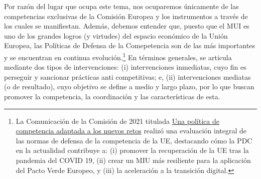 \documentclass[10pt,a4paper]{article}
\begin{document}
Por razón del lugar que ocupa este tema, nos ocuparemos únicamente de las competencias exclusivas de la Comisión Europea y los instrumentos a través de los cuales se manifiestan. Además, debemos entender que, puesto que el MUI es uno de los grandes logros (y virtudes) del espacio económico de la Unión Europea, las Políticas de Defensa de la Comepetencia son de las más importantes y se encuentran en continua evolución.\footnote{%
    La Comunicación de la Comisión de 2021 titulada \href{https://op.europa.eu/es/publication-detail/-/publication/27d5395b-d204-11ec-a95f-01aa75ed71a1/language-es?afd_azwaf_tok=eyJraWQiOiIxQTE2ODY0MTQ5MjEwQ0Y0M0VFMzlGM0FEN0NENUIyOEU3RkQxNDU2RDU0OThCRTA3NzVDMEM3NTEyNjBEODYzIiwiYWxnIjoiUlMyNTYifQ.eyJhdWQiOiJvcC5ldXJvcGEuZXUiLCJleHAiOjE3ODQxOTY2NTUsImlhdCI6MTc4NDE5NjY0NSwiaXNzIjoidGllcjEtNTdiZjU0YjdkLXM5N2ZyIiwic3ViIjoiODMuNTAuMzIuMjExIiwiZGF0YSI6eyJ0eXBlIjoiaXNzdWVkIiwicmVmIjoiMjAyNjA3MTZUMTAxMDQ1Wi1yMTU3YmY1NGI3ZHM5N2ZyaEMxTVJTZzNlZzAwMDAwMDBoa2cwMDAwMDAwMDJjNmQiLCJiIjoiS05WRThRS0dZRjdhdmFzZnQ3RVBKVkJ0VXpmd0NnXzFMbmdYNjUtVVZNYyIsImgiOiJrX2xkd19PVVl3Wm44dGFuUy1Gam9yRlFwdXoxUkZLdTdxZ0tiOFZ1OHNvIn19.OBC3XLrxddjzjrkwuft2Yy-4zEJBhYfNeHTIpsnJ6OcwD33cTT_zDQ2re1q8D9HAthZQhrglsw6IEfJDnRN8VlHU27ww_oytSW913Pa84HcP9AXhs_PqfXEIbO17mYBHLQn1Rg7-kQOTXHmIc-0R_US4rBBaVSIqgIK9W--Qx3qwA0-_ydST04Tm3ybMwLOasfwJFchIhg_9Otu5zfKohY9FdY8BwP4ugGhyLhThfjE00Cl7a5zRVBOECIANIi8po9ZJOexOazXBsqmIMDViyXig-DA2k-6dMfqsdM_ih8oy3EJPN1Ix-8fstDM8jdU5RxfJ9mV4VB1nQEzEaanlcw.WF3obl2IDtqgvMFRqVdYkD5s}{Una política de competencia adaptada a los nuevos retos} realizó una evaluación integral de las normas de defensa de la competencia de la UE, destacando cómo la PDC en la actualidad contribuye a: (i) promover la recuperación de la UE tras la pandemia del COVID 19, (ii) crear un MIU más resiliente para la aplicación del Pacto Verde Europeo, y (iii) la aceleración a la transición digital.
} En términos generales, se articula mediante dos tipos de intervenciones: (i) intervenciones inmediatas, cuyo fin es perseguir y sancionar prácticas anti competitivas; e, (ii) intervenciones mediatas (o de resultado), cuyo objetivo se define a medio y largo plazo, por lo que buscan promover la competencia, la coordinación y las características de esta. 
\end{document}
